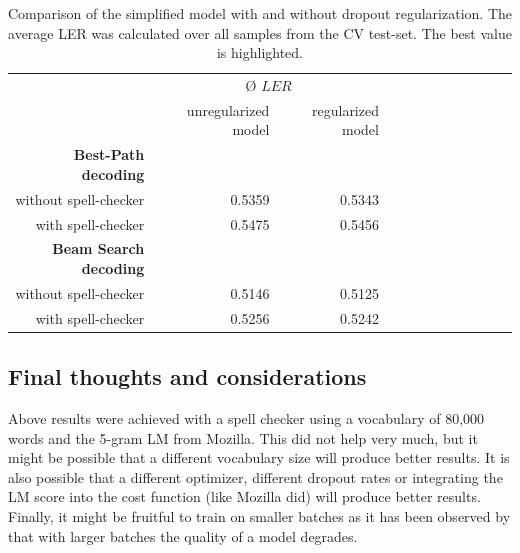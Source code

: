 \begin{table}[h!]
	\centering
	\begin{tabular}{@{}rrrrcrrrcrrr@{}}\toprule
		& \multicolumn{2}{c}{Ø $LER$} \\
		\cmidrule{2-3}
		& unregularized model & regularized model\\ \midrule
		\textbf{Best-Path decoding}\\
		without spell-checker & 0.5359 & 0.5343 \\
		with spell-checker & 0.5475 & 0.5456 \\
		\textbf{Beam Search decoding}\\
		without spell-checker & 0.5146 & \cellcolor{green!25}0.5125 \\
		with spell-checker & 0.5256 & 0.5242 \\
		\bottomrule
	\end{tabular}
	\caption{Comparison of the simplified model with and without dropout regularization. The average \ac{LER} was calculated over all samples from the \ac{CV} test-set. The best value is highlighted.}
	\label{comparison_regularized_unregularized}
\end{table}



\subsection{Final thoughts and considerations}

Above results were achieved with a spell checker using a vocabulary of 80,000 words and the 5-gram \ac{LM} from Mozilla. This did not help very much, but it might be possible that a different vocabulary size will produce better results. It is also possible that a different optimizer, different dropout rates or integrating the \ac{LM} score into the cost function (like Mozilla did) will produce better results. Finally, it might be fruitful to train on smaller batches as it has been observed by \cite{batch_size_rnn} that with larger batches the quality of a model degrades. 

